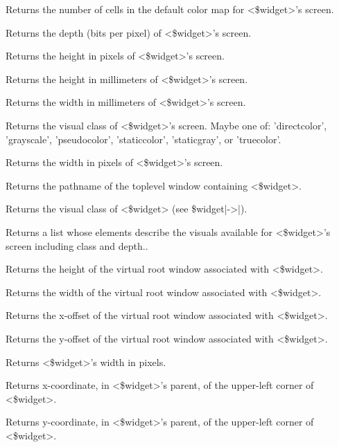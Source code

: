 \begin{enum}{1cm}
Returns the number of cells in the default color map for <\$widget>'s
screen.

Returns the depth (bits per pixel) of <\$widget>'s screen.

Returns the height in pixels of <\$widget>'s screen.

Returns the height in millimeters of <\$widget>'s screen.

Returns the width in millimeters of <\$widget>'s screen.

Returns the visual class of <\$widget>'s screen. Maybe one of: 'directcolor',
'grayscale', 'pseudocolor', 'staticcolor', 'staticgray', or 'truecolor'.

Returns the width in pixels of <\$widget>'s screen.

Returns the pathname of the toplevel window containing <\$widget>.

Returns the visual class of <\$widget> (see \$widget|->|).

Returns a list whose elements describe the visuals available for
<\$widget>'s screen including class and depth..

Returns the height of the virtual root window associated with <\$widget>.

Returns the width of the virtual root window associated with <\$widget>.

Returns the x-offset of the virtual root window associated with <\$widget>.

Returns the y-offset of the virtual root window associated with <\$widget>.

Returns <\$widget>'s width in  pixels.

Returns x-coordinate, in <\$widget>'s parent, of the upper-left corner of
<\$widget>.

Returns y-coordinate, in <\$widget>'s parent, of the upper-left corner of
<\$widget>.

\end{enum}

